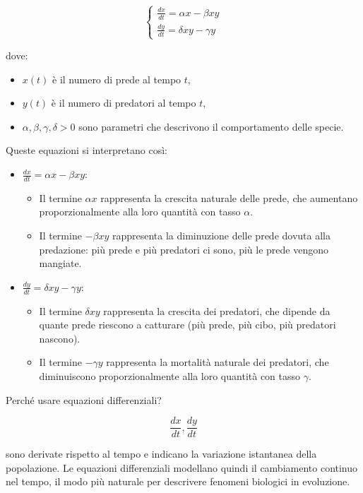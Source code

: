 \documentclass[12pt,a4paper]{article}
\begin{document}
\[
\begin{cases}
\frac{dx}{dt} = \alpha x - \beta x y \\
\frac{dy}{dt} = \delta x y - \gamma y
\end{cases}
\]

dove:
\begin{itemize}
    \item \(x(t)\) è il numero di prede al tempo \(t\),
    \item \(y(t)\) è il numero di predatori al tempo \(t\),
    \item \(\alpha, \beta, \gamma, \delta > 0\) sono parametri che descrivono il comportamento delle specie.
\end{itemize}

Queste equazioni si interpretano così:

\begin{itemize}
    \item \(\frac{dx}{dt} = \alpha x - \beta x y\):
    \begin{itemize}
        \item Il termine \(\alpha x\) rappresenta la crescita naturale delle prede, che aumentano proporzionalmente alla loro quantità con tasso \(\alpha\).
        \item Il termine \(- \beta x y\) rappresenta la diminuzione delle prede dovuta alla predazione: più prede e più predatori ci sono, più le prede vengono mangiate.
    \end{itemize}
    
    \item \(\frac{dy}{dt} = \delta x y - \gamma y\):
    \begin{itemize}
        \item Il termine \(\delta x y\) rappresenta la crescita dei predatori, che dipende da quante prede riescono a catturare (più prede, più cibo, più predatori nascono).
        \item Il termine \(- \gamma y\) rappresenta la mortalità naturale dei predatori, che diminuiscono proporzionalmente alla loro quantità con tasso \(\gamma\).
    \end{itemize}
\end{itemize}

Perché usare equazioni differenziali?

\[
\frac{dx}{dt}, \frac{dy}{dt}
\]

sono derivate rispetto al tempo e indicano la variazione istantanea della popolazione. Le equazioni differenziali modellano quindi il cambiamento continuo nel tempo, il modo più naturale per descrivere fenomeni biologici in evoluzione.
\end{document}

